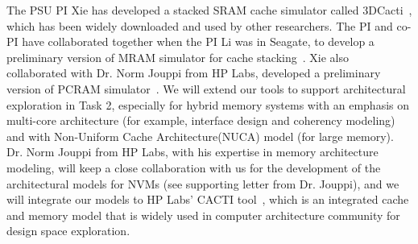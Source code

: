 The PSU PI Xie has developed a stacked SRAM cache
simulator called 3DCacti~\cite{xie:iccd05-3d, XIE:TVLSI2008-3DCacti},
which has been widely downloaded and used by other researchers.
The PI and co-PI have collaborated together when the PI Li was in Seagate,
to develop a preliminary version of MRAM simulator for cache stacking~\cite{MRAM:DONG08,XIE:HPCA09}.
Xie also collaborated with Dr. Norm Jouppi
from HP Labs, developed a preliminary version of PCRAM simulator~\cite{xie:pcramsim}.
We will extend our tools to support architectural exploration in Task 2, especially
for hybrid memory systems with an emphasis on multi-core architecture
(for example, interface design and coherency modeling)
and with Non-Uniform Cache Architecture(NUCA) model (for large
memory). Dr. Norm Jouppi from HP Labs,
with his expertise in memory architecture modeling, will keep a close
collaboration with us for the development of the architectural models for NVMs (see supporting letter
from Dr. Jouppi), and we will integrate our models to HP Labs' CACTI tool~\cite{CACTI}, which is an integrated cache and memory model that is widely used in computer architecture community for design space exploration.

